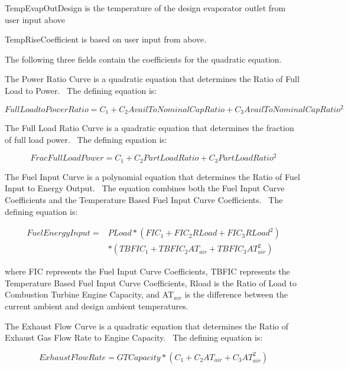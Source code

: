 TempEvapOutDesign is the temperature of the design evaporator outlet from user input above

TempRiseCoefficient is based on user input from above.

The following three fields contain the coefficients for the quadratic equation.

The Power Ratio Curve is a quadratic equation that determines the Ratio of Full Load to Power.~ The defining equation is:

\begin{equation}
FullLoadtoPowerRatio = {C_1} + {C_2}AvailToNominalCapRatio + {C_3}AvailToNominalCapRati{o^2}
\end{equation}

The Full Load Ratio Curve is a quadratic equation that determines the fraction of full load power.~ The defining equation is:

\begin{equation}
FracFullLoadPower = {C_1} + {C_2}PartLoadRatio + {C_3}PartLoadRati{o^2}
\end{equation}

The Fuel Input Curve is a polynomial equation that determines the Ratio of Fuel Input to Energy Output.~ The equation combines both the Fuel Input Curve Coefficients and the Temperature Based Fuel Input Curve Coefficients.~ The defining equation is:

\begin{equation}
\begin{split}
FuelEnergyInput =& PLoad * (FI{C_1} + FI{C_2}RLoad + FI{C_3}RLoa{d^2}) \\
&* (TBFI{C_1} + TBFI{C_2}A{T_{air}} + TBFI{C_3}AT_{air}^2)
\end{split}
\end{equation}

where FIC represents the Fuel Input Curve Coefficients, TBFIC represents the Temperature Based Fuel Input Curve Coefficients, Rload is the Ratio of Load to Combustion Turbine Engine Capacity, and AT\(_{air}\) is the difference between the current ambient and design ambient temperatures.

The Exhaust Flow Curve is a quadratic equation that determines the Ratio of Exhaust Gas Flow Rate to Engine Capacity.~ The defining equation is:

\begin{equation}
ExhaustFlowRate = GTCapacity * ({C_1} + {C_2}A{T_{air}} + {C_3}AT_{air}^2)
\end{equation}


